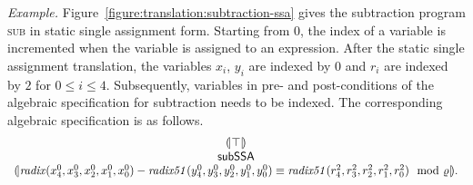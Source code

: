 \noindent
\emph{Example.}
Figure~\ref{figure:translation:subtraction-ssa} gives the subtraction program
\textsc{sub} in static single assignment form. Starting from $0$, the
index of a variable is incremented when the variable is assigned to an
expression. After the static single assignment translation, the
variables ${x}_i$, ${y}_i$ are indexed by $0$ and
${r}_i$ are indexed by $2$ for $0 \leq i \leq 4$. 
Subsequently, variables in pre- and post-conditions of the algebraic
specification for subtraction needs to be indexed. The
corresponding algebraic specification is as follows.
\[
\begin{array}{c}
{(\!|}{\top}{|\!)}\\
\mbox{\textsf{subSSA}}\\
{(\!|}{\mathit{radix}({x}^0_4, {x}^0_3, {x}^0_2, {x}^0_1, {x}^0_0) -
\mathit{radix51}({y}^0_4, {y}^0_3, {y}^0_2, {y}^0_1, {y}^0_0)
\equiv
\mathit{radix51}({r}^2_4, {r}^2_3, {r}^2_2, {r}^2_1, {r}^2_0)
\mod {\varrho}
}{|\!)}.
\end{array}
\]

